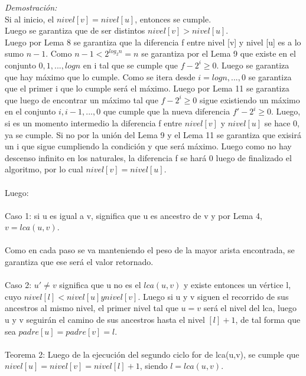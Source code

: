 \documentclass[12pt]{article}
\begin{document}
\textit{Demostración:}\\
Si al inicio, el $nivel [v] = nivel [u]$, entonces se cumple. \\
Luego se garantiza que de ser distintos $nivel [v] > nivel [u]$.\\
Luego por Lema 8 se garantiza que la diferencia f entre nivel [v] y nivel [u] es a lo sumo $n-1$.
Como $n-1 < 2^{log_2n} = n$ se garantiza por el Lema 9 que existe en el conjunto ${0, 1,..., log n}$ en i tal que se cumple que $f - 2^i \geq 0$. Luego se garantiza que hay m\'aximo que lo cumple.  Como se itera desde $i = log n,...,0$ se garantiza que el primer i que lo cumple ser\'a el m\'aximo.  Luego por Lema 11 se garantiza que luego de encontrar un m\'aximo tal que  $f - 2^i \geq 0$ sigue existiendo un m\'aximo  en el conjunto ${i, i-1,...,0}$ que cumple que la nueva diferencia $f'- 2^i \geq 0$.  Luego,  si es un momento intermedio la diferencia f entre $nivel [v]$ y $nivel [u]$ se hace 0, ya se cumple.  Si no por la uni\'on del Lema 9 y el Lema 11 se garantiza que exisir\'a un i que sigue cumpliendo la condici\'on y que ser\'a m\'aximo.  Luego como no hay descenso infinito en los naturales, la diferencia f se har\'a 0 luego de finalizado el algoritmo, por lo cual $nivel [v] = nivel [u]$.\\
\\


Luego:\\
\\


Caso 1: si u es igual a v, significa que u es ancestro de v y por Lema 4, $v = lca (u, v)$.\\
\\


Como en cada paso se va manteniendo el peso de la mayor arista encontrada, se garantiza que ese ser\'a el valor retornado.\\
\\



Caso 2:  $u' \neq v$  significa que u no es el $lca (u,v)$ y existe entonces un v\'ertice l, cuyo $nivel [l] < nivel [u] y nivel[v]$. Luego si u y v siguen el recorrido de sus ancestros al mismo nivel, el primer nivel tal que $u = v$ ser\'a el nivel del lca, luego u y v seguir\'an el camino
de sus ancestros hasta el nivel $[l] + 1$, de tal forma que sea $padre [u] = padre [v] = l$.\\
\\


Teorema 2: Luego de la ejecuci\'on del segundo ciclo for de lca(u,v), se cumple que $nivel[u] = nivel [v] = nivel [l] + 1$, siendo $l = lca(u,v)$.\\
\\
\end{document}
